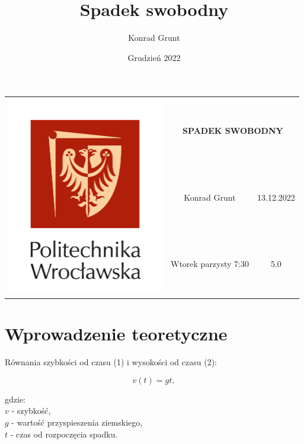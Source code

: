 \documentclass[12pt, a4paper]{article}
\title{Spadek swobodny}
\author{Konrad Grunt}
\date{Grudzień 2022}
\begin{document}
\pagestyle{plain}

\begin{center}
    \begin{tabular}{|c|c|c|}
        \hline
        \multirow{9}{*}{\includegraphics{logopwr.png}}
        & \multicolumn{2}{c|}{}\\
        & \multicolumn{2}{c|}{\textbf{SPADEK SWOBODNY}}\\
        & \multicolumn{2}{c|}{}\\
        \cline{2-3}
        & & \\
        & \multicolumn{1}{c|}{Konrad Grunt} & 13.12.2022\\
        & & \\
        \cline{2-3}
        & & \\
        & \multicolumn{1}{c|}{Wtorek parzysty 7:30} & 5.0\\
        & & \\
        \hline
    \end{tabular}
\end{center}

\vspace{2cm}

\section{Wprowadzenie teoretyczne}

\vspace{1cm}
Równania szybkości od czasu (1) i wysokości od czasu (2):

\begin{equation}
    v(t)=gt,
\end{equation}

gdzie:\\
\(v\) - szybkość,\\
\(g\) - wartość przyspieszenia ziemskiego,\\
\(t\) - czas od rozpoczęcia spadku.
\end{document}
